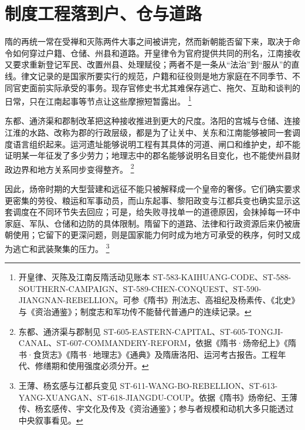 \section{制度工程落到户、仓与道路}
\label{sec:sui-state-capacity-local-burdens}

隋的再统一常在受禅和灭陈两件大事之间被讲完，然而新朝能否留下来，取决于命令如何穿过户籍、仓储、州县和道路。开皇律令为官府提供共同的刑名，江南接收又要求重新登记军民、改置州县、处理赋役；两者不是一条从“法治”到“服从”的直线。律文记录的是国家所要实行的规范，户籍和征役则是地方家庭在不同季节、不同官吏面前实际承受的事务。现存官修史书尤其难保存逃亡、拖欠、互助和谈判的日常，只在江南起事等节点让这些摩擦短暂露出。%
\footnote{开皇律、灭陈及江南反隋活动见账本 ST-583-KAIHUANG-CODE、ST-588-SOUTHERN-CAMPAIGN、ST-589-CHEN-CONQUEST、ST-590-JIANGNAN-REBELLION。可参《隋书》刑法志、高祖纪及杨素传、《北史》与《资治通鉴》；制度志和军功传不能替代普通户的连续记录。}

东都、通济渠和郡制改革把这种接收推进到更大的尺度。洛阳的宫城与仓储、连接江淮的水路、改称为郡的行政层级，都是为了让关中、关东和江南能够被同一套调度语言组织起来。运河遗址能够说明工程有其具体的河道、闸口和维护史，却不能证明某一年征发了多少劳力；地理志中的郡名能够说明名目变化，也不能使州县财政边界和地方关系同步变得整齐。%
\footnote{东都、通济渠与郡制见 ST-605-EASTERN-CAPITAL、ST-605-TONGJI-CANAL、ST-607-COMMANDERY-REFORM，依据《隋书·炀帝纪上》《隋书·食货志》《隋书·地理志》《通典》及隋唐洛阳、运河考古报告。工程年代、修缮期和使用强度必须分开。}

因此，炀帝时期的大型营建和远征不能只被解释成一个皇帝的奢侈。它们确实要求更密集的劳役、粮运和军事动员，而山东起事、黎阳政变与江都兵变也确实显示这套调度在不同环节失去回应；可是，给失败寻找单一的道德原因，会抹掉每一环中家庭、军队、仓储和边防的具体限制。隋留下的道路、法律和行政资源后来仍被唐朝使用；它留下的更深问题，则是国家能力何时成为地方可承受的秩序，何时又成为逃亡和武装聚集的压力。%
\footnote{王薄、杨玄感与江都兵变见 ST-611-WANG-BO-REBELLION、ST-613-YANG-XUANGAN、ST-618-JIANGDU-COUP。依据《隋书》炀帝纪、王薄传、杨玄感传、宇文化及传及《资治通鉴》；参与者规模和动机大多只能透过中央叙事看见。}
